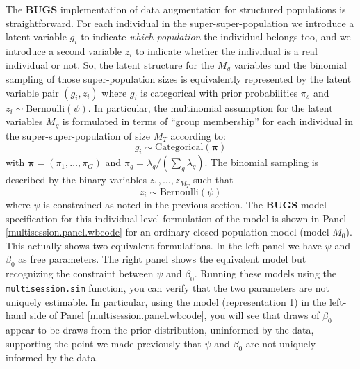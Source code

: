 The {\bf BUGS} implementation of data augmentation for structured
populations is straightforward.  For each individual in the
super-super-population we introduce a latent variable $g_{i}$ to indicate
{\it which population} the individual belongs too, and we introduce a
second variable $z_{i}$ to indicate whether the individual is a real
individual or not.  So, the latent structure for the $M_{g}$ variables
and the binomial sampling of those super-population sizes is
equivalently represented by the latent variable pair $(g_{i},z_{i})$
where $g_{i}$ is categorical with prior probabilities $\pi_{s}$ and
$z_{i} \sim \mbox{Bernoulli}(\psi)$.  In particular, the multinomial
assumption for the latent variables $M_{g}$ is formulated in terms of
``group membership'' for each individual in the super-super-population of
size $M_{T}$ according to:
\[
 g_{i} \sim \mbox{Categorical}\left( {\bm \pi} \right)
\]
with ${\bm \pi} = (\pi_{1}, \ldots, \pi_{G})$ and $\pi_{g} =
\lambda_{g}/(\sum_{g} \lambda_{g})$.  The binomial sampling is
described by the binary variables $z_{1},\ldots,z_{M_{T}}$ such that
\[
 z_{i} \sim \mbox{Bernoulli}(\psi)
\]
where $\psi$ is constrained as noted in the previous section.  The
{\bf BUGS} model specification for this individual-level formulation
of the model is shown in Panel \ref{multisession.panel.wbcode} for an
ordinary closed population model (model $M_{0}$).  This actually shows
two equivalent formulations. In the left panel we have $\psi$ and
$\beta_{0}$ as free parameters.  The right panel shows the equivalent
model but recognizing the constraint between $\psi$ and $\beta_{0}$.
Running these models using the \mbox{\tt multisession.sim} function,
you can verify that the two parameters are not uniquely estimable. In
particular, using the model (representation 1) in the left-hand side
of Panel \ref{multisession.panel.wbcode}, you will see that draws of
$\beta_{0}$ appear to be draws from the prior distribution, uninformed
by the data, supporting the point we made previously that $\psi$ and
$\beta_0$ are not uniquely informed by the data.


